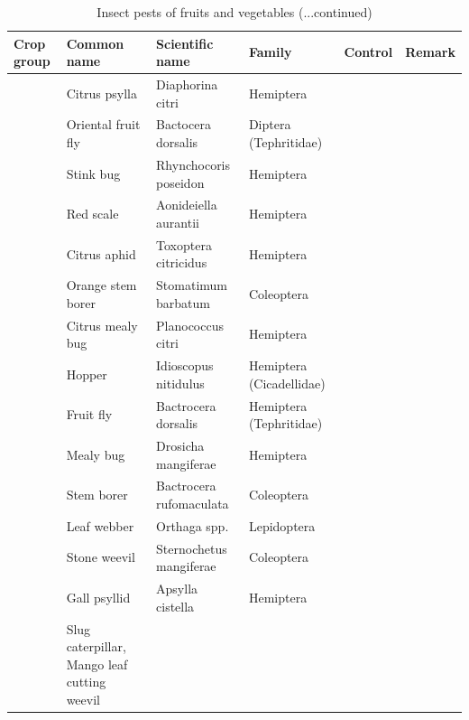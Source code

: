 \documentclass[10pt,dvipsnames,ignorenonframetext,aspectratio=169]{beamer}
\begin{document}
\begin{frame}{}
\protect\hypertarget{section-21}{}
\begin{table}

\caption{\label{tab:unnamed-chunk-3}Insect pests of fruits and vegetables (...continued)}
\centering
\fontsize{4}{6}\selectfont
\begin{tabular}[t]{>{\raggedright\arraybackslash}p{5em}>{\raggedright\arraybackslash}p{13em}>{\raggedright\arraybackslash}p{14em}>{\raggedright\arraybackslash}p{14em}>{\raggedright\arraybackslash}p{7em}>{\raggedright\arraybackslash}p{12em}}
\toprule
Crop group & Common name & Scientific name & Family & Control & Remark\\
\midrule
 & Citrus psylla & Diaphorina citri & Hemiptera &  & \\
\cmidrule{2-6}
 & Oriental fruit fly & Bactocera dorsalis & Diptera (Tephritidae) &  & \\
\cmidrule{2-6}
 & Stink bug & Rhynchocoris poseidon & Hemiptera &  & \\
\cmidrule{2-6}
 & Red scale & Aonideiella aurantii & Hemiptera &  & \\
\cmidrule{2-6}
 & Citrus aphid & Toxoptera citricidus & Hemiptera &  & \\
\cmidrule{2-6}
 & Orange stem borer & Stomatimum barbatum & Coleoptera &  & \\
\cmidrule{2-6}
\multirow{-7}{5em}{\raggedright\arraybackslash Citrus} & Citrus mealy bug & Planococcus citri & Hemiptera &  & \\
\cmidrule{1-6}
 & Hopper & Idioscopus nitidulus & Hemiptera (Cicadellidae) &  & \\
\cmidrule{2-6}
 & Fruit fly & Bactrocera dorsalis & Hemiptera (Tephritidae) &  & \\
\cmidrule{2-6}
 & Mealy bug & Drosicha mangiferae & Hemiptera &  & \\
\cmidrule{2-6}
 & Stem borer & Bactrocera rufomaculata & Coleoptera &  & \\
\cmidrule{2-6}
 & Leaf webber & Orthaga spp. & Lepidoptera &  & \\
\cmidrule{2-6}
 & Stone weevil & Sternochetus mangiferae & Coleoptera &  & \\
\cmidrule{2-6}
 & Gall psyllid & Apsylla cistella & Hemiptera &  & \\
\cmidrule{2-6}
\multirow{-8}{5em}{\raggedright\arraybackslash Mango} & Slug caterpillar, Mango leaf cutting weevil &  &  &  & \\
\bottomrule
\end{tabular}
\end{table}
\end{frame}
\end{document}
